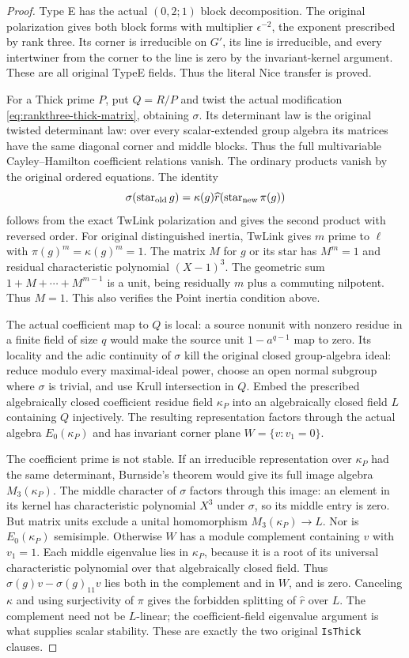 \begin{proof}
Type E has the actual $(0,2;1)$ block decomposition.  The original
polarization gives both block forms with multiplier $\epsilon^{-2}$,
the exponent prescribed by rank three.  Its corner is irreducible
on $G'$, its line is irreducible, and every intertwiner from the
corner to the line is zero by the invariant-kernel argument.
These are all original TypeE fields.  Thus the literal Nice transfer
is proved.

For a Thick prime $P$, put $Q=R/P$ and twist the actual modification
\eqref{eq:rankthree-thick-matrix}, obtaining $\sigma$.
Its determinant law is the original twisted determinant law:
over every scalar-extended group algebra its matrices have the same
diagonal corner and middle blocks.  Thus the full multivariable
Cayley--Hamilton coefficient relations vanish.  The ordinary
products vanish by the original ordered equations.  The identity
\[
 \sigma(\operatorname{star}_{\rm old}g)
       =\kappa(g)\widehat r(\operatorname{star}_{\rm new}\pi(g))
\]
follows from the exact TwLink polarization and gives the second
product with reversed order.  For original distinguished inertia,
TwLink gives $m$ prime to $\ell$ with $\pi(g)^m=\kappa(g)^m=1$.
The matrix $M$ for $g$ or its star has $M^m=1$ and residual
characteristic polynomial $(X-1)^3$.  The geometric sum
$1+M+\cdots+M^{m-1}$ is a unit, being residually $m$ plus a
commuting nilpotent.  Thus $M=1$.  This also verifies the Point
inertia condition above.

The actual coefficient map to $Q$ is local: a source nonunit with
nonzero residue in a finite field of size $q$ would make the source
unit $1-a^{q-1}$ map to zero.  Its locality and the adic continuity
of $\sigma$ kill the original closed group-algebra ideal: reduce
modulo every maximal-ideal power, choose an open normal subgroup
where $\sigma$ is trivial, and use Krull intersection in $Q$.
Embed the prescribed algebraically closed coefficient residue field
$\kappa_P$ into an algebraically closed field $L$ containing $Q$
injectively.  The resulting representation factors through the
actual algebra $E_0(\kappa_P)$ and has invariant corner plane
$W=\{v:v_1=0\}$.

The coefficient prime is not stable.  If an irreducible representation
over $\kappa_P$ had the same determinant, Burnside's theorem would
give its full image algebra $M_3(\kappa_P)$.  The middle character
of $\sigma$ factors through this image: an element in its kernel
has characteristic polynomial $X^3$ under $\sigma$, so its middle
entry is zero.  But matrix units exclude a unital homomorphism
$M_3(\kappa_P)\to L$.
Nor is $E_0(\kappa_P)$ semisimple.  Otherwise $W$ has a module
complement containing $v$ with $v_1=1$.  Each middle eigenvalue
lies in $\kappa_P$, because it is a root of its universal
characteristic polynomial over that algebraically closed field.
Thus $\sigma(g)v-\sigma(g)_{11}v$ lies both in the complement and
in $W$, and is zero.  Canceling $\kappa$ and using surjectivity
of $\pi$ gives the forbidden splitting of $\widehat r$ over $L$.
The complement need not be $L$-linear; the coefficient-field
eigenvalue argument is what supplies scalar stability.  These
are exactly the two original \texttt{IsThick} clauses.


\end{proof}
